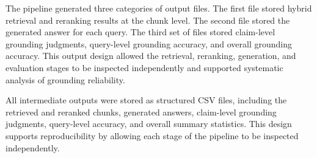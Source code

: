 The pipeline generated three categories of output files. The first file stored hybrid retrieval and reranking results at the chunk level. The second file stored the generated answer for each query. The third set of files stored claim-level grounding judgments, query-level grounding accuracy, and overall grounding accuracy. This output design allowed the retrieval, reranking, generation, and evaluation stages to be inspected independently and supported systematic analysis of grounding reliability.

All intermediate outputs were stored as structured CSV files, including the retrieved and reranked chunks, generated answers, claim-level grounding judgments, query-level accuracy, and overall summary statistics. This design supports reproducibility by allowing each stage of the pipeline to be inspected independently.